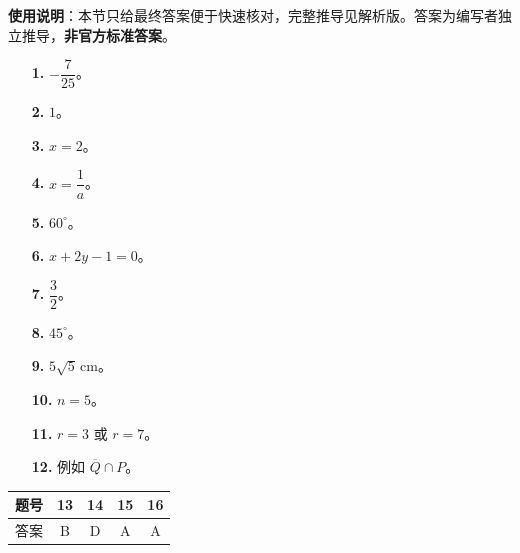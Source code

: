 
\begin{gknotice}
\textbf{使用说明}：本节只给最终答案便于快速核对，完整推导见解析版。答案为编写者独立推导，\textbf{非官方标准答案}。
\end{gknotice}

\begin{itemize}[leftmargin=2.6em]
  \item[\textbf{1.}] $-\dfrac{7}{25}$。
  \item[\textbf{2.}] $1$。
  \item[\textbf{3.}] $x=2$。
  \item[\textbf{4.}] $x=\dfrac{1}{a}$。
  \item[\textbf{5.}] $60^\circ$。
  \item[\textbf{6.}] $x+2y-1=0$。
  \item[\textbf{7.}] $\dfrac{3}{2}$。
  \item[\textbf{8.}] $45^\circ$。
  \item[\textbf{9.}] $5\sqrt{5}\,\mathrm{cm}$。
  \item[\textbf{10.}] $n=5$。
  \item[\textbf{11.}] $r=3$ 或 $r=7$。
  \item[\textbf{12.}] 例如 $\overline{Q}\cap P$。
\end{itemize}

\begin{center}\begin{tabular}{ccccc}
\toprule
题号 & 13 & 14 & 15 & 16 \\
\midrule
答案 & B & D & A & A \\
\bottomrule
\end{tabular}\end{center}

